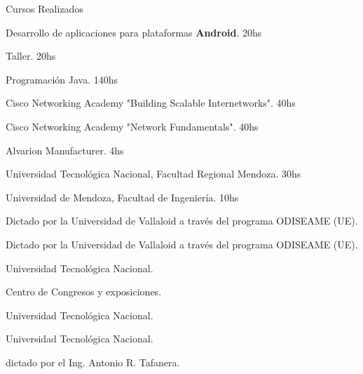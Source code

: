 \begin{rubric}{Cursos Realizados}


\entry*[Año 2012]
	Desarrollo de aplicaciones para plataformas {\bfseries Android}. 20hs

 Taller. 20hs

 Programación Java. 140hs 


 Cisco Networking Academy "Building Scalable Internetworks". 40hs

 Cisco Networking Academy "Network Fundamentals".  40hs

 Alvarion Manufacturer. 4hs

 Universidad Tecnológica Nacional, 
Facultad Regional Mendoza. 30hs

 Universidad de Mendoza, Facultad de Ingeniería. 10hs

 Dictado por la Universidad de Vallaloid a través del programa ODISEAME (UE).

 Dictado por la Universidad de Vallaloid a través del programa ODISEAME (UE).

 Universidad Tecnológica Nacional.

 Centro de Congresos y exposiciones.

 Universidad Tecnológica Nacional.

 Universidad Tecnológica Nacional.

 dictado por el Ing. Antonio R. Tafanera.

\end{rubric}
